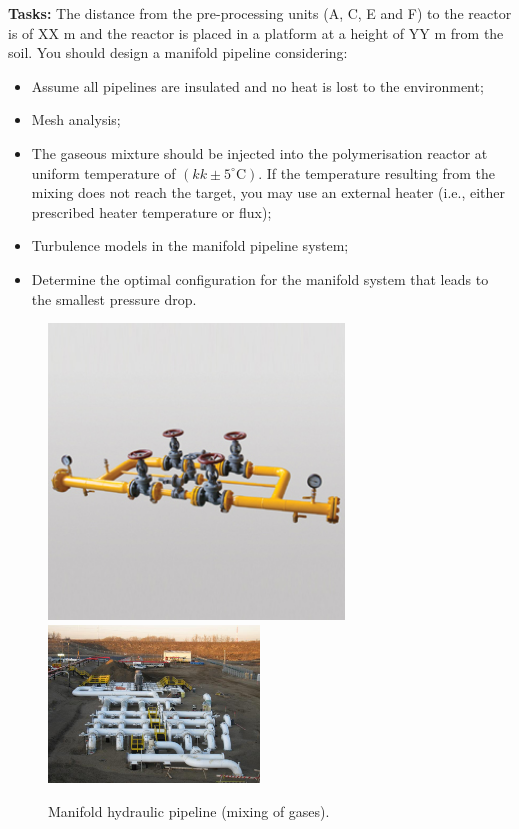 \documentclass[12pts,a4paper,amsmath,amssymb,floatfix]{article}%
\begin{document}
\begin{enumerate}[A.]
     {\bf Tasks:} The distance from the pre-processing units (A, C, E and F) to the reactor is of XX m and the reactor is placed in a platform at a height of YY m from the soil. You should design a manifold pipeline considering:
     \begin{itemize}
        \item Assume all pipelines are insulated and no heat is lost to the environment;
        \item Mesh analysis;
        \item The gaseous mixture should be injected into the polymerisation reactor at uniform temperature of $\left(kk\pm 5^{\circ}\text{C}\right)$. If the temperature resulting from the mixing does not reach the target, you may use an external heater (i.e., either prescribed heater temperature or flux);
        \item Turbulence models in the manifold pipeline system;
        \item Determine the optimal configuration for the manifold system that leads to the smallest pressure drop.
     \end{itemize}
     
     
     
    

     \begin{figure}[h]
         \vbox{ \hbox{\hspace{1cm}\includegraphics[width=0.7\textwidth,clip]{./Pics/ManifoldPipeline1.jpg}}
                \hbox{\hspace{3cm}\includegraphics[width=0.5\textwidth,clip]{./Pics/ManifoldPipeline2.jpg}}}
         \caption{Manifold hydraulic pipeline (mixing of gases). }\label{ManifoldPipeline}
     \end{figure}


\end{enumerate}
\end{document}
